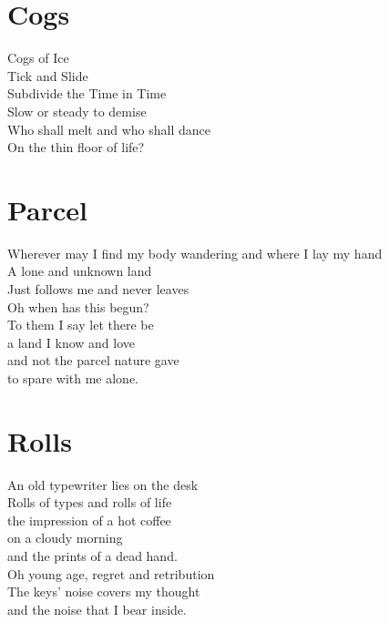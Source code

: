 \documentclass[a4paper,twoside, openany]{book}
\newenvironment{Verse}
  {\center\varwidth{\linewidth}\fontsize{18}{21.6}\selectfont}
  {\endvarwidth\endcenter}
\begin{document}
\pagestyle{empty}
\begin{center}
\end{center}
\clearpage
\tableofcontents
\mainmatter



\chapter{Cogs}
\begin{Verse}
    Cogs of Ice\\
    Tick and Slide\\
    Subdivide the Time in Time\\
    Slow or steady to demise\\
    Who shall melt and who shall dance\\
    On the thin floor of life?
\end{Verse}


\chapter{Parcel}
\begin{Verse}
    Wherever may I find my body wandering and where I lay my hand\\
    A lone and unknown land\\
    Just follows me and never leaves\\
    Oh when has this begun?\\

    To them I say let there be \\
    a land I know and love\\
    and not the parcel nature gave\\
    to spare with me alone.
\end{Verse}


\chapter{Rolls}
\begin{Verse}
    An old typewriter lies on the desk\\
    Rolls of types and rolls of life\\
    the impression of a hot coffee\\
    on a cloudy morning\\
    and the prints of a dead hand.\\
    Oh young age, regret and retribution\\
    The keys' noise covers my thought\\
    and the noise that I bear inside.
\end{Verse}
\end{document}
